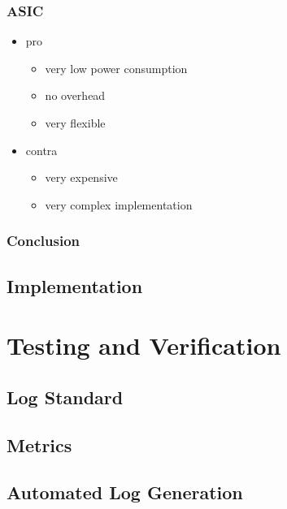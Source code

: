 \documentclass[mscthesis]{usiinfthesis}
\begin{document}
\subsection{ASIC}
\begin{itemize}
    \item pro
    \begin{itemize}
        \item very low power consumption
        \item no overhead
        \item very flexible
    \end{itemize}
    \item contra
    \begin{itemize}
        \item very expensive
        \item very complex implementation
    \end{itemize}
\end{itemize}

\subsection{Conclusion}

\section{Implementation}

\chapter{Testing and Verification}
\section{Log Standard}
\section{Metrics}
\section{Automated Log Generation}
\end{document}

